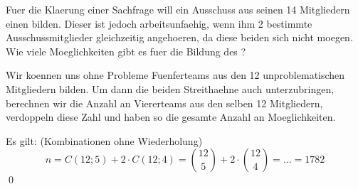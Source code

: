 \documentclass{abgabe}
\begin{document}
\begin{questions}
    \question
    Fuer die Klaerung einer Sachfrage will ein Ausschuss aus seinen 14 Mitgliedern einen  bilden. 
    Dieser ist jedoch arbeitsunfaehig, wenn ihm 2 bestimmte Ausschussmitglieder gleichzeitig angehoeren, da diese beiden sich nicht moegen.
    Wie viele Moeglichkeiten gibt es fuer die Bildung des ?
    \begin{solution}
        Wir koennen uns ohne Probleme Fuenferteams aus den 12 unproblematischen Mitgliedern bilden. 
        Um dann die beiden Streithaehne auch unterzubringen, berechnen wir die Anzahl an Viererteams aus den selben 12 Mitgliedern, verdoppeln diese Zahl und haben so die gesamte Anzahl an Moeglichkeiten.

        Es gilt: (Kombinationen ohne Wiederholung)
        \[ 
            n = C(12;5) + 2 \cdot C(12;4) = \binom{12}{5} + 2 \cdot \binom{12}{4} = \ldots = \num{1782}
        \] 
        \qed
    \end{solution}
\end{questions}
\end{document}
